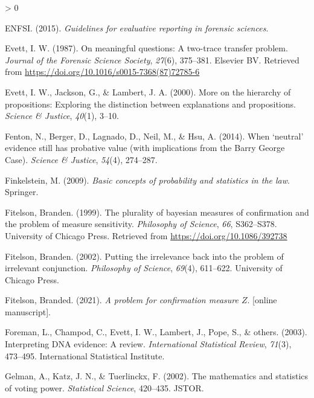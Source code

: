 \documentclass[
  10pt,
  dvipsnames,enabledeprecatedfontcommands]{scrartcl}
\newlength{\cslhangindent}
\newenvironment{CSLReferences}[2] %
 {%
  \setlength{\parindent}{0pt}
  \ifodd #1 \everypar{\setlength{\hangindent}{\cslhangindent}}\ignorespaces\fi
  \ifnum #2 > 0
  \setlength{\parskip}{#2\baselineskip}
  \fi
 }%
 {}
\begin{document}
\begin{CSLReferences}{1}{0}
\leavevmode\hypertarget{ref-enfs2015}{}%
ENFSI. (2015). \emph{Guidelines for evaluative reporting in forensic
sciences}.

\leavevmode\hypertarget{ref-Evett1987}{}%
Evett, I. W. (1987). On meaningful questions: A two-trace transfer
problem. \emph{Journal of the Forensic Science Society}, \emph{27}(6),
375--381. Elsevier {BV}. Retrieved from
\url{https://doi.org/10.1016/s0015-7368(87)72785-6}

\leavevmode\hypertarget{ref-evett2000MoreHierarchyPropositions}{}%
Evett, I. W., Jackson, G., \& Lambert, J. A. (2000). More on the
hierarchy of propositions: Exploring the distinction between
explanations and propositions. \emph{Science \& Justice}, \emph{40}(1),
3--10.

\leavevmode\hypertarget{ref-fenton2014WhenNeutralEvidence}{}%
Fenton, N., Berger, D., Lagnado, D., Neil, M., \& Hsu, A. (2014). When
{`neutral'} evidence still has probative value (with implications from
the {Barry George Case}). \emph{Science \& Justice}, \emph{54}(4),
274--287.

\leavevmode\hypertarget{ref-finkelstein2009basic}{}%
Finkelstein, M. (2009). \emph{Basic concepts of probability and
statistics in the law}. Springer.

\leavevmode\hypertarget{ref-Fitelson1999plurality}{}%
Fitelson, Branden. (1999). The plurality of bayesian measures of
confirmation and the problem of measure sensitivity. \emph{Philosophy of
Science}, \emph{66}, S362--S378. University of Chicago Press. Retrieved
from \url{https://doi.org/10.1086/392738}

\leavevmode\hypertarget{ref-Fitelson2002irrelevance}{}%
Fitelson, Branden. (2002). Putting the irrelevance back into the problem
of irrelevant conjunction. \emph{Philosophy of Science}, \emph{69}(4),
611--622. University of Chicago Press.

\leavevmode\hypertarget{ref-Fitelson2021z_measure}{}%
Fitelson, Branded. (2021). \emph{A problem for confirmation measure
\(Z\)}. {[}online manuscript{]}.

\leavevmode\hypertarget{ref-foreman2003interpreting}{}%
Foreman, L., Champod, C., Evett, I. W., Lambert, J., Pope, S., \&
others. (2003). Interpreting DNA evidence: A review. \emph{International
Statistical Review}, \emph{71}(3), 473--495. International Statistical
Institute.

\leavevmode\hypertarget{ref-gelman2002mathematics}{}%
Gelman, A., Katz, J. N., \& Tuerlinckx, F. (2002). The mathematics and
statistics of voting power. \emph{Statistical Science}, 420--435. JSTOR.


\end{CSLReferences}
\end{document}

